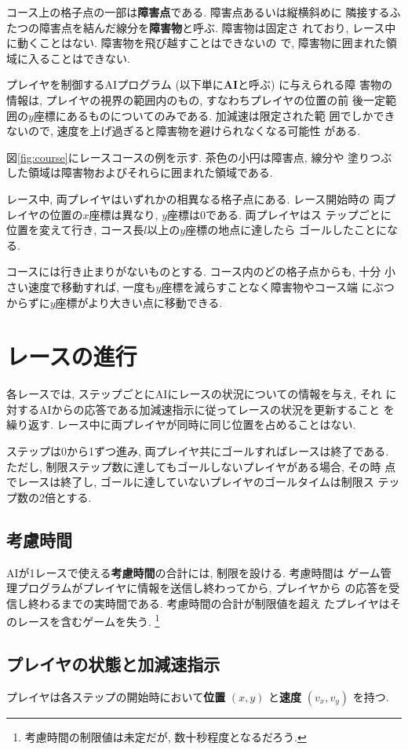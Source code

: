 \documentclass[11pt]{jarticle}
\begin{document}
コース上の格子点の一部は{\bf 障害点}である.  障害点あるいは縦横斜めに
隣接するふたつの障害点を結んだ線分を{\bf 障害物}と呼ぶ. 障害物は固定さ
れており, レース中に動くことはない.  障害物を飛び越すことはできないの
で, 障害物に囲まれた領域に入ることはできない.

プレイヤを制御するAIプログラム (以下単に{\bf AI}と呼ぶ) に与えられる障
害物の情報は, プレイヤの視界の範囲内のもの, すなわちプレイヤの位置の前
後一定範囲の$y$座標にあるものについてのみである. 加減速は限定された範
囲でしかできないので, 速度を上げ過ぎると障害物を避けられなくなる可能性
がある.

図\ref{fig:course}にレースコースの例を示す. 茶色の小円は障害点, 線分や
塗りつぶした領域は障害物およびそれらに囲まれた領域である.

レース中, 両プレイヤはいずれかの相異なる格子点にある.  レース開始時の
両プレイヤの位置の$x$座標は異なり, $y$座標は$0$である.  両プレイヤはス
テップごとに位置を変えて行き, コース長$l$以上の$y$座標の地点に達したら
ゴールしたことになる.

コースには行き止まりがないものとする. コース内のどの格子点からも, 十分
小さい速度で移動すれば, 一度も$y$座標を減らすことなく障害物やコース端
にぶつからずに$y$座標がより大きい点に移動できる.

\section{レースの進行}
各レースでは, ステップごとにAIにレースの状況についての情報を与え, それ
に対するAIからの応答である加減速指示に従ってレースの状況を更新すること
を繰り返す.  レース中に両プレイヤが同時に同じ位置を占めることはない.

ステップは0から1ずつ進み, 両プレイヤ共にゴールすればレースは終了である.
ただし, 制限ステップ数に達してもゴールしないプレイヤがある場合, その時
点でレースは終了し, ゴールに達していないプレイヤのゴールタイムは制限ス
テップ数の2倍とする.

\subsection{考慮時間}
AIが1レースで使える{\bf 考慮時間}の合計には, 制限を設ける. 考慮時間は
ゲーム管理プログラムがプレイヤに情報を送信し終わってから, プレイヤから
の応答を受信し終わるまでの実時間である.  考慮時間の合計が制限値を超え
たプレイヤはそのレースを含むゲームを失う.
\footnote{考慮時間の制限値は未定だが, 数十秒程度となるだろう.}

\subsection{プレイヤの状態と加減速指示}
プレイヤは各ステップの開始時において{\bf 位置} $(x, y)$ と{\bf 速度}
$(v_x, v_y)$ を持つ.
\end{document}
